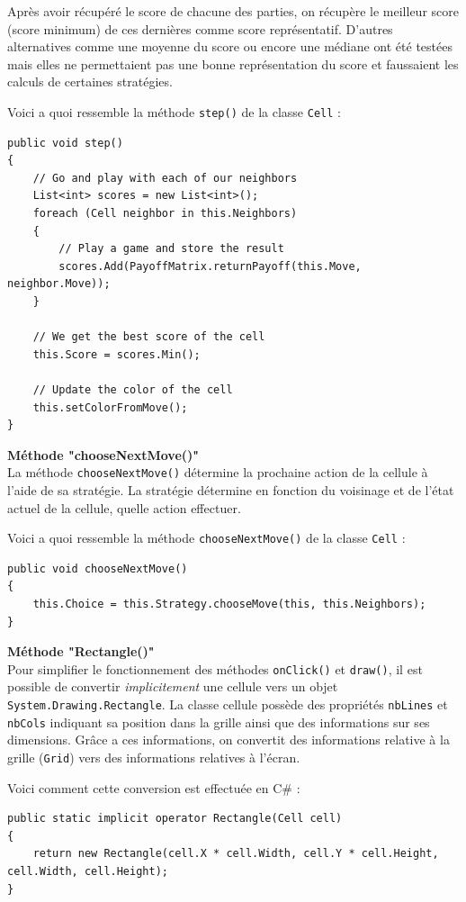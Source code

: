 \documentclass[a4paper]{article}
\begin{document}
Après avoir récupéré le score de chacune des parties, on récupère le meilleur score (score minimum) de ces dernières comme score représentatif. D'autres alternatives comme une moyenne du score ou encore une médiane \cite{Median} ont été testées mais elles ne permettaient pas une bonne représentation du score et faussaient les calculs de certaines stratégies.

Voici a quoi ressemble la méthode \texttt{step()} de la classe \texttt{Cell} :
\begin{lstlisting}
public void step()
{
    // Go and play with each of our neighbors
    List<int> scores = new List<int>();
    foreach (Cell neighbor in this.Neighbors)
    {
        // Play a game and store the result
        scores.Add(PayoffMatrix.returnPayoff(this.Move, neighbor.Move));
    }

    // We get the best score of the cell
    this.Score = scores.Min();

    // Update the color of the cell
    this.setColorFromMove();
}
\end{lstlisting}

\textbf{Méthode "chooseNextMove()"}\\
La méthode \texttt{chooseNextMove()} détermine la prochaine action de la cellule à l'aide de sa stratégie. La stratégie détermine en fonction du voisinage et de l'état actuel de la cellule, quelle action effectuer. 

Voici a quoi ressemble la méthode \texttt{chooseNextMove()} de la classe \texttt{Cell} :

\begin{lstlisting}
public void chooseNextMove()
{
    this.Choice = this.Strategy.chooseMove(this, this.Neighbors);
}
\end{lstlisting}

\textbf{Méthode "Rectangle()"}\\
Pour simplifier le fonctionnement des méthodes \texttt{onClick()} et \texttt{draw()}, il est possible de convertir \textit{implicitement} une cellule vers un objet \texttt{System.Drawing.Rectangle}. La classe cellule possède des propriétés \texttt{nbLines} et \texttt{nbCols} indiquant sa position dans la grille ainsi que des informations sur ses dimensions. Grâce a ces informations, on convertit des informations relative à la grille (\texttt{Grid}) vers des informations relatives à l'écran.

Voici comment cette conversion est effectuée en C\# :
\begin{lstlisting}
public static implicit operator Rectangle(Cell cell)
{
    return new Rectangle(cell.X * cell.Width, cell.Y * cell.Height, cell.Width, cell.Height);
}
\end{lstlisting}
\end{document}
